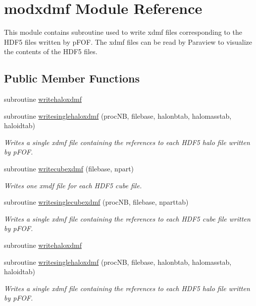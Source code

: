 \hypertarget{classmodxdmf}{\section{modxdmf Module Reference}
\label{classmodxdmf}
}


This module contains subroutine used to write xdmf files corresponding to the H\-D\-F5 files written by p\-F\-O\-F. The xdmf files can be read by Paraview to visualize the contents of the H\-D\-F5 files.  


\subsection*{Public Member Functions}
\begin{DoxyCompactItemize}
\item 
subroutine \hyperlink{classmodxdmf_ae2f7d2597902a070b71c0f7e57a1fd94}{writehaloxdmf}
\item 
subroutine \hyperlink{classmodxdmf_ab794d1f6abf632c9ff4279bec51e13b1}{writesinglehaloxdmf} (proc\-N\-B, filebase, halonbtab, halomasstab, haloidtab)
\begin{DoxyCompactList}\small\item\em Writes a single xdmf file containing the references to each H\-D\-F5 halo file written by p\-F\-O\-F. \end{DoxyCompactList}\item 
subroutine \hyperlink{classmodxdmf_a72e8949508c9724a4993f8f43447a1ea}{writecubexdmf} (filebase, npart)
\begin{DoxyCompactList}\small\item\em Writes one xmdf file for each H\-D\-F5 cube file. \end{DoxyCompactList}\item 
subroutine \hyperlink{classmodxdmf_ae843cb42b7f4598f934c91195facf470}{writesinglecubexdmf} (proc\-N\-B, filebase, nparttab)
\begin{DoxyCompactList}\small\item\em Writes a single xdmf file containing the references to each H\-D\-F5 cube file written by p\-F\-O\-F. \end{DoxyCompactList}\item 
subroutine \hyperlink{classmodxdmf_ae2f7d2597902a070b71c0f7e57a1fd94}{writehaloxdmf}
\item 
subroutine \hyperlink{classmodxdmf_ab794d1f6abf632c9ff4279bec51e13b1}{writesinglehaloxdmf} (proc\-N\-B, filebase, halonbtab, halomasstab, haloidtab)
\begin{DoxyCompactList}\small\item\em Writes a single xdmf file containing the references to each H\-D\-F5 halo file written by p\-F\-O\-F. \end{DoxyCompactList}\item 

\end{DoxyCompactItemize}

